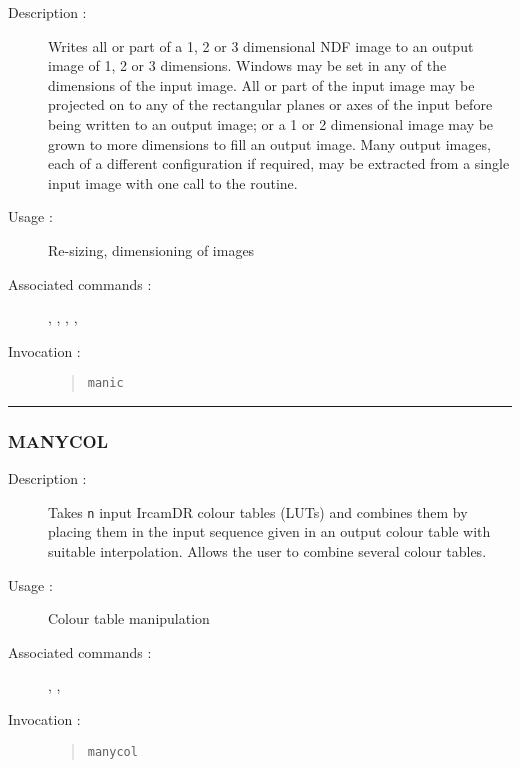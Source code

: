 \begin{description}

\item[Description :] Writes all or part of a 1, 2 or 3 dimensional
NDF image to an output image of 1, 2 or 3 dimensions. Windows may be
set in any of the dimensions of the input image. All or part of the
input image may be projected on to any of the rectangular planes or
axes of the input before being written to an output image; or a 1 or 2
dimensional image may be grown to more dimensions to fill an output
image. Many output images, each of a different configuration if
required, may be extracted from a single input image with one call to
the routine.

\item[Usage :] Re-sizing, dimensioning of images

\item[Associated commands :] {\tt {}},
{\tt {}}, {\tt {}},
{\tt {}}, {\tt {}}

\item[Invocation :]

\begin{quote}{\tt  manic }\end{quote}

\end{description}

\hrule
\subsubsection*{\label{MANYCOL}MANYCOL}

\begin{description}

\item[Description :] Takes {\tt n} input {\sc IrcamDR} colour tables
(LUTs) and combines them by placing them in the input sequence given in
an output colour table with suitable interpolation.  Allows the user to
combine several colour tables.

\item[Usage :] Colour table manipulation
\item[Associated commands :] {\tt {}},
{\tt {}}, {\tt {}}
\item[Invocation :]

\begin{quote}{\tt  manycol }\end{quote}

\end{description}

